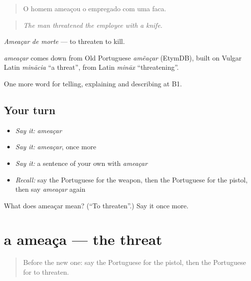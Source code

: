 \begin{quote}
O homem ameaçou o empregado com uma faca.
\end{quote}

\begin{quote}
\emph{The man threatened the employee with a knife.}
\end{quote}

\emph{Ameaçar de morte} — to threaten to kill.

\begin{cousinweb}
\emph{ameaçar} comes down from Old Portuguese \emph{amẽaçar} (EtymDB), built on Vulgar Latin \emph{minācia} \textquotedblleft{}a threat\textquotedblright{}, from Latin \emph{mināx} \textquotedblleft{}threatening\textquotedblright{}.
\end{cousinweb}

\begin{grammarlens}[title={What you've built}]
One more word for telling, explaining and describing at B1.
\end{grammarlens}

\subsection*{Your turn}
\begin{itemize}
\raggedright
  \item \emph{Say it:} \emph{ameaçar}
  \item \emph{Say it:} \emph{ameaçar}, once more
  \item \emph{Say it:} a sentence of your own with \emph{ameaçar}
  \item \emph{Recall:} say the Portuguese for the weapon, then the Portuguese for the pistol, then say \emph{ameaçar} again
\end{itemize}

\begin{tcolorbox}[breakable,colback=teal!4,colframe=teal!35!black,title={Before you move on}]
What does ameaçar mean? (\textquotedblleft{}To threaten\textquotedblright{}.) Say it once more.
\end{tcolorbox}
\section[a ameaça]{a ameaça — the threat}

\label{lesson:PT-C290-ameaca}



\begin{quote}
Before the new one: say the Portuguese for the pistol, then the Portuguese for to threaten.
\end{quote}

